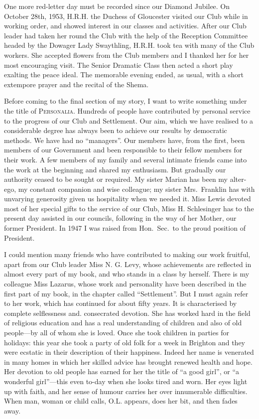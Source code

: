 One more red-letter day must be recorded since our
Diamond Jubilee. On October 28th, 1953, H.R.H. the
Duchess of Gloucester visited our Club while in working
order, and showed interest in our classes and activities.
After our Club leader had taken her round the Club
with the help of the Reception Committee headed by
the Dowager Lady Swaythling, H.R.H. took tea with
many of the Club workers. She accepted flowers from
the Club members and I thanked her for her most
encouraging visit. The Senior Dramatic Class then
acted a short play exalting the peace ideal. The
memorable evening ended, as usual, with a short
extempore prayer and the recital of the Shema.

Before coming to the final section of my story, I want
to write something under the title of \textsc{Personalia}.
Hundreds of people have contributed by personal
service to the progress of our Club and Settlement. Our
aim, which we have realised to a considerable degree
has always been to achieve our results by democratic
methods. We have had no “managers”. Our members
have, from the first, been members of our Government
and been responsible to their fellow members for their
work. A few members of my family and several intimate
friends came into the work at the beginning and shared
my enthusiasm. But gradually our authority ceased to
be sought or required. My sister Marian has been my
alter-ego, my constant companion and wise colleague;
my sister Mrs.\ Franklin has with unvarying generosity
given us hospitality when we needed it. Miss Lewis
devoted most of her special gifts to the service of our
Club, Miss H. Schlesinger has to the present day assisted
in our councils, following in the way of her Mother, our
former President. In 1947 I was raised from Hon.\ Sec.\ to
the proud position of President.

I could mention many friends who have contributed
to making our work fruitful, apart from our Club leader
Miss N. G. Levy, whose achievements are reflected in
almost every part of my book, and who stands in a class
by herself. There is my colleague Miss Lazarus, whose
work and personality have been described in the first
part of my book, in the chapter called “Settlement”.
But I must again refer to her work, which has continued
for about fifty years. It is characterised by complete
selflessness and. consecrated devotion. She has worked
hard in the field of religious education and has a real
understanding of children and also of old people—by all
of whom she is loved. Once she took children in parties
for holidays: this year she took a party of old folk for a
week in Brighton and they were ecstatic in their description
of their happiness. Indeed her name is venerated
in many homes in which her skilled advice has brought
renewed health and hope. Her devotion to old people
has earned for her the title of “a good girl”, or “a
wonderful girl”—this even to-day when she looks tired
and worn. Her eyes light up with faith, and her sense
of humour carries her over innumerable difficulties.
When man, woman or child calls, O.L. appears, does
her bit, and then fades away.

